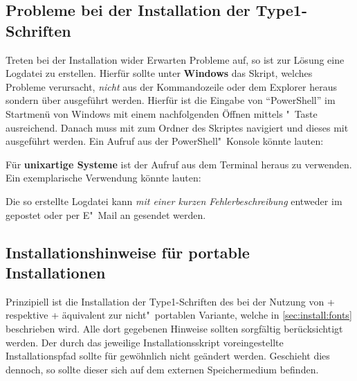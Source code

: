 \subsection{Probleme bei der Installation der Type1-Schriften}
%
Treten bei der Installation wider Erwarten Probleme auf, so ist zur Lösung eine 
Logdatei zu erstellen. Hierfür sollte unter \textbf{Windows} das Skript, 
welches Probleme verursacht, \emph{nicht} aus der Kommandozeile oder dem 
Explorer heraus sondern über  ausgeführt 
werden. Hierfür ist die Eingabe von \enquote{PowerShell} im Startmenü von 
Windows mit einem nachfolgenden Öffnen mittels "~Taste 
ausreichend. Danach muss mit  zum Ordner des Skriptes navigiert und 
dieses mit  
ausgeführt werden. Ein Aufruf aus der PowerShell"~Konsole könnte lauten:
%
\begin{quoting}
\RET*%
\RET%
\end{quoting}
%
Für \textbf{unixartige Systeme} ist der Aufruf 
 aus dem Terminal heraus zu 
verwenden. Ein exemplarische Verwendung könnte lauten:
%
\begin{quoting}
\RET*%
\RET%
\end{quoting}
%
Die so erstellte Logdatei kann \emph{mit einer kurzen Fehlerbeschreibung} 
entweder im \GitHubRepo gepostet oder per E"~Mail an \mailto{\TUDScriptContact}
gesendet werden.



\subsection{%
  Installationshinweise für portable Installationen%
  \label{sec:install:portable}%
}

Prinzipiell ist die Installation der Type1-Schriften des \CDs bei der Nutzung 
von \TeXLive+ respektive \MiKTeX+ äquivalent zur nicht"~portablen Variante, 
welche in \autoref{sec:install:fonts} beschrieben wird. Alle dort gegebenen 
Hinweise sollten sorgfältig berücksichtigt werden. Der durch das jeweilige 
Installationsskript voreingestellte Installationspfad sollte für gewöhnlich 
nicht geändert werden. Geschieht dies dennoch, so sollte dieser sich auf dem 
externen Speichermedium  befinden.


